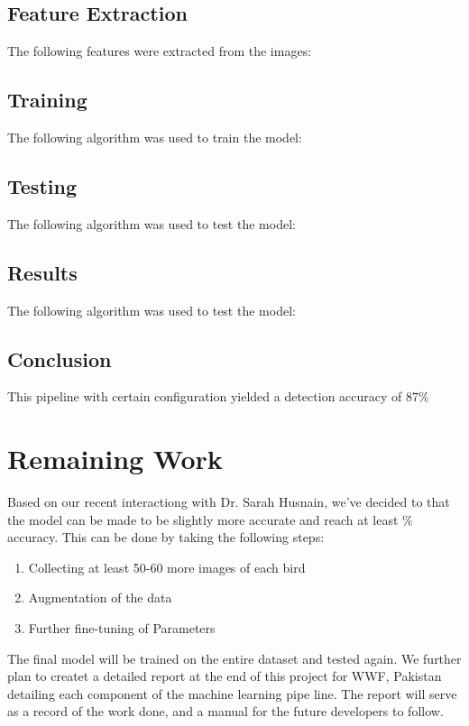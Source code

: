 \documentclass{article}
\begin{document}
    \subsection*{Feature Extraction}
    The following features were extracted from the images:

    \subsection*{Training}
    The following algorithm was used to train the model:
    

    \subsection*{Testing}
    The following algorithm was used to test the model:
    
    \subsection*{Results}
    The following algorithm was used to test the model:
    
    \subsection*{Conclusion}
    
    This pipeline with certain configuration yielded a detection accuracy of 87$\%$


    \section*{Remaining Work}
    
    Based on our recent interactiong with Dr. Sarah Husnain, we've decided to that the model can be made to be slightly more accurate and reach at least $\%$ accuracy. This can be done by taking the following steps:
    \begin{enumerate}
        \item Collecting at least 50-60 more images of each bird
        \item Augmentation of the data
        \item Further fine-tuning of Parameters
    \end{enumerate}
    The final model will be trained on the entire dataset and tested again. We further plan to createt a detailed report at the end of this project for WWF, Pakistan detailing each component of the machine learning pipe line. The report will serve as a record of the work done, and a manual for the future developers to follow.
    
\end{document}

